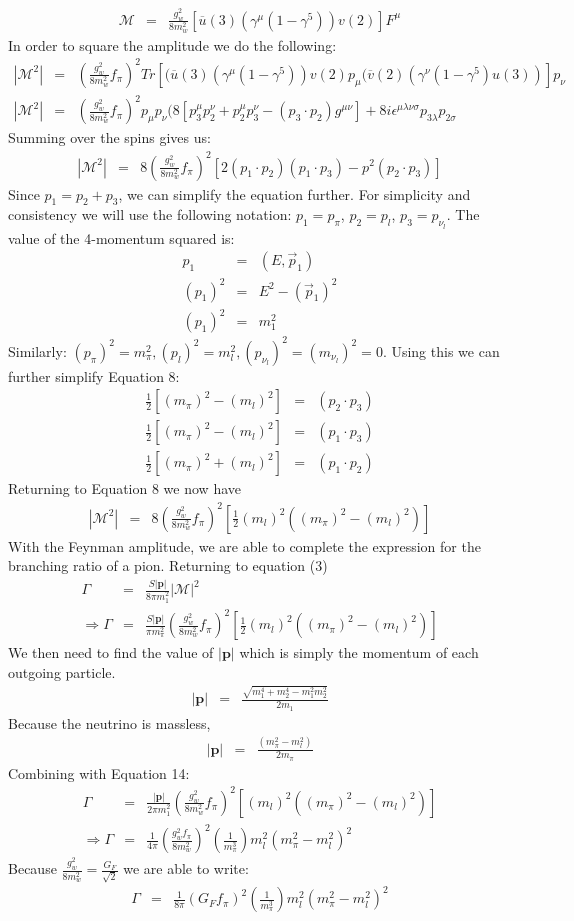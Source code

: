 \documentclass[12pt]{article}
\def \bea{\begin{eqnarray}}
\def \eea{\end{eqnarray}}
\def \({\left(}
\def \){\right)}
\def \[{\left[}
\def \]{\right]}
\def \nn{\nonumber}
\def \nl{\nn \\}
\def \ou{\overline{u}}
\def \ov{\overline{v}}
\def \ga{\gamma}
\def \Ga{\Gamma}
\def \la{\lambda}
\def \si{\sigma}
\begin{document}
\bea
\mathcal{M}&=&\frac{g_w^2}{8 m_w^2}\[\ou(3)(\ga^\mu(1-\ga^5))v(2)\]F^\mu
\eea
In order to square the amplitude we do the following: 
\bea
|\mathcal{M}^2|&=&\(\frac{g_w^2}{8 m_w^2}f_\pi\)^2Tr[(\ou(3)(\ga^\mu(1-\ga^5))v(2)p_\mu(\ov(2)(\ga^\nu(1-\ga^5)u(3))]p_\nu\\
|\mathcal{M}^2|&=&\(\frac{g_w^2}{8m_w^2}f_\pi\)^2p_\mu p_\nu (8[p_3^\mu p_2^\nu + p_2^\mu p_3^\nu -(p_3 \cdot p_2)g^{\mu\nu}]+8i\epsilon^{\mu\la\nu\si}p_{3\la}p_{2\si}
\eea
Summing over the spins gives us: 
\bea 
|\mathcal{M}^2|&=&8\(\frac{g_w^2}{8m_w^2}f_\pi\)^2 \[2(p_1\cdot p_2)(p_1 \cdot p_3) -p^2(p_2 \cdot p_3)\] 
\eea 
Since $p_1 = p_2 + p_3$, we can simplify the equation further. For simplicity and consistency we will use the following notation: $p_1 = p_\pi$,  $p_2=p_l$,  $p_3=p_{\nu_l}$. The value of the 4-momentum squared is: 
\bea 
p_1 &=& (E, \vec{p}_1) \\
(p_1)^2 &=& E^2 - (\vec{p}_1)^2\nl 
(p_1)^2 &=& m_1^2
\eea 
Similarly:
$(p_\pi)^2 = m_\pi^2 ,(p_l)^2 = m_l^2 , (p_{\nu_l})^2 = (m_{\nu_l})^2 = 0$. Using this we can further simplify Equation 8:
\bea 
\frac{1}{2}[(m_\pi)^2 -(m_l)^2] &=& (p_2 \cdot p_3)\\
\frac{1}{2}[(m_\pi)^2 -(m_l)^2] &=& (p_1 \cdot p_3)\\
\frac{1}{2}[(m_\pi)^2 +(m_l)^2] &=& (p_1 \cdot p_2)
\eea 
Returning to Equation 8 we now have
\bea 
|\mathcal{M}^2|&=&8\(\frac{g_w^2}{8m_w^2}f_\pi\)^2\[\frac{1}{2}(m_l)^2((m_\pi)^2- (m_l)^2)\]
\eea 
With the Feynman amplitude, we are able to complete the expression for the branching ratio of a pion. Returning to equation (3)
\bea 
\Ga &=& \frac{S|\textbf{p}|}{8\pi m_1^2} |\mathcal{M}|^2\\
\Rightarrow \Ga &=& \frac{S|\textbf{p}|}{\pi m_\pi^2}\(\frac{g_w^2}{8m_w^2}f_\pi\)^2\[\frac{1}{2}(m_l)^2((m_\pi)^2 -(m_l)^2)\]
\eea 
 We then need to find the value of $|\textbf{p}|$ which is simply the momentum of each outgoing particle. 
\bea
|\textbf{p}| &=& \frac{\sqrt{m_1^4+m_2^4-m_1^2m_2^2}}{2m_1}
\eea
Because the neutrino is massless,
\bea
|\textbf{p}| &=& \frac{(m_\pi^2-m_l^2)}{2m_\pi}
\eea
Combining with Equation 14: 
\bea 
\Ga &=& \frac{|\textbf{p}|}{2\pi m_1^2}\(\frac{g_w^2}{8m_w^2}f_\pi\)^2\[(m_l)^2((m_\pi)^2 -(m_l)^2)\]\\
\Rightarrow \Ga &=& \frac{1}{4\pi}\(\frac{g_w^2f_\pi}{8m_w^2}\)^2\(\frac{1}{m_\pi^3}\)m_l^2(m_\pi^2-m_l^2)^2
\eea
Because $\frac{g_w^2}{8m_w^2}= \frac{G_F}{\sqrt{2}}$ we are able to write:
\bea
\Ga &=& \frac{1}{8\pi}\(G_F f_\pi\)^2\(\frac{1}{m_\pi^3}\)m_l^2(m_\pi^2-m_l^2)^2
\eea 
\end{document}
